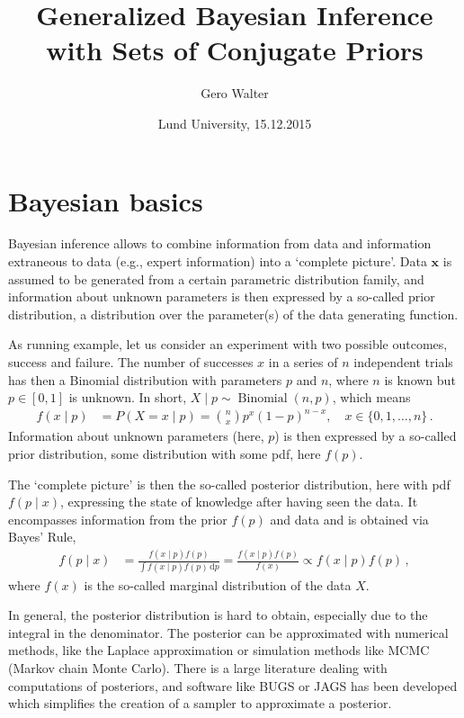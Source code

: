 \documentclass[12pt,a4paper	,twoside]{article}
\title{Generalized Bayesian Inference\\ with Sets of Conjugate Priors}
\author{Gero Walter}
\date{Lund University, 15.12.2015}
\newcommand{\dd}{\,\mathrm{d}}
\newcommand{\bs}[1]{\boldsymbol{#1}}
\renewcommand{\vec}[1]{{\bs#1}}
\newcommand{\bin}{\operatorname{Binomial}}
\begin{document}
\maketitle

\section{Bayesian basics}

Bayesian inference allows to combine information from data
and information extraneous to data (e.g., expert information)
into a `complete picture'.
Data $\vec{x}$ is assumed to be generated from a certain parametric distribution family,
and information about unknown parameters is then expressed by a so-called prior distribution,
a distribution over the parameter(s) of the data generating function.

As running example, let us consider an experiment with two possible outcomes,
success and failure. The number of successes $x$ in a series of $n$ independent trials
has then a Binomial distribution with parameters $p$ and $n$,
where $n$ is known but $p \in [0,1]$ is unknown.
In short, $X\mid p \sim \bin(n,p)$, which means
\begin{align*}
f(x\mid p) &= P(X = x \mid p) = {n \choose x} p^x (1-p)^{n-x},\quad x \in \{0, 1, \ldots, n\}\,.
\end{align*}
Information about unknown parameters (here, $p$) is then expressed
by a so-called prior distribution, some distribution with some pdf, here $f(p)$.

The `complete picture' is then the so-called posterior distribution,
here with pdf $f(p\mid x)$, expressing the state of knowledge after having seen the data.
It encompasses information from the prior $f(p)$ and data
and is obtained via Bayes' Rule,
\begin{align}
f(p \mid x) &= \frac{f(x\mid p) f(p)}{\int f(x\mid p) f(p) \dd p}
             = \frac{f(x\mid p) f(p)}{f(x)} \propto f(x\mid p) f(p)\,,
\label{eq:bayesrule}
\end{align}
where $f(x)$ is the so-called marginal distribution of the data $X$.

In general, the posterior distribution is hard to obtain,
especially due to the integral in the denominator.
The posterior can be approximated with numerical methods,
like the Laplace approximation or simulation methods like MCMC (Markov chain Monte Carlo).
There is a large literature dealing with computations of posteriors,
and software like BUGS or JAGS has been developed
which simplifies the creation of a sampler to approximate a posterior.
\end{document}
